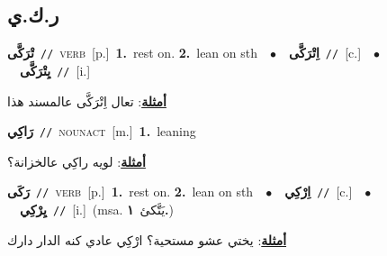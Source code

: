 \documentclass[10pt,a4paper,twoside]{article} %
\begin{document}
\begin{multicols}{2}
\vspace{-3mm}
\subsection*{\color{blue}\foreignlanguage{arabic}{ر.ك.ي}\color{blue}{}} 

{\setlength\topsep{0pt}\textbf{\foreignlanguage{arabic}{تْرَكَّى}}\ {\color{gray}\texttt{//}\color{black}}\ \textsc{verb}\ [p.]\ \textbf{1.}~rest on.  \textbf{2.}~lean on sth\ \ $\bullet$\ \ \setlength\topsep{0pt}\textbf{\foreignlanguage{arabic}{اِتْرَكَّى}}\ {\color{gray}\texttt{//}\color{black}}\ [c.]\ \ $\bullet$\ \ \setlength\topsep{0pt}\textbf{\foreignlanguage{arabic}{يِتْرَكَّى}}\ {\color{gray}\texttt{//}\color{black}}\ [i.]\  \begin{flushright}\color{gray}\foreignlanguage{arabic}{\textbf{\underline{\foreignlanguage{arabic}{أمثلة}}}: تعال اِتْرَكَّى عالمسند هذا}\end{flushright}\color{black}} \vspace{2mm}

{\setlength\topsep{0pt}\textbf{\foreignlanguage{arabic}{رَاكِي}}\ {\color{gray}\texttt{//}\color{black}}\ \textsc{noun\textunderscore act}\ [m.]\ \textbf{1.}~leaning\  \begin{flushright}\color{gray}\foreignlanguage{arabic}{\textbf{\underline{\foreignlanguage{arabic}{أمثلة}}}: لويه راكِي عالخزانة؟}\end{flushright}\color{black}} \vspace{2mm}

{\setlength\topsep{0pt}\textbf{\foreignlanguage{arabic}{رَكَى}}\ {\color{gray}\texttt{//}\color{black}}\ \textsc{verb}\ [p.]\ \textbf{1.}~rest on.  \textbf{2.}~lean on sth\ \ $\bullet$\ \ \setlength\topsep{0pt}\textbf{\foreignlanguage{arabic}{اِرْكِي}}\ {\color{gray}\texttt{//}\color{black}}\ [c.]\ \ $\bullet$\ \ \setlength\topsep{0pt}\textbf{\foreignlanguage{arabic}{يِرْكِي}}\ {\color{gray}\texttt{//}\color{black}}\ [i.]\ \color{gray}(msa. \foreignlanguage{arabic}{يَتَّكئ}~\foreignlanguage{arabic}{\textbf{١.}})\color{black}\  \begin{flushright}\color{gray}\foreignlanguage{arabic}{\textbf{\underline{\foreignlanguage{arabic}{أمثلة}}}: يختي عشو مستحية؟ ارْكِي عادي كنه الدار دارك}\end{flushright}\color{black}} \vspace{2mm}


\end{multicols}
\end{document}
